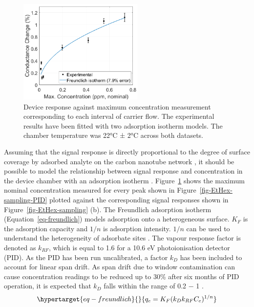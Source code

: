 \documentclass[
  a4paper,
]{scrbook}
\begin{document}
\begin{figure}

{\centering \includegraphics[width=0.55\textwidth,height=\textheight]{figures/ch6/EtHex-ratio-comparison.png}

}

\caption{\label{fig-EtHex-ratio-comparison}Device response against
maximum concentration measurement corresponding to each interval of
carrier flow. The experimental results have been fitted with two
adsorption isotherm models. The chamber temperature was 22°C ± 2°C
across both datasets.}

\end{figure}

Assuming that the signal response is directly proportional to the degree
of surface coverage by adsorbed analyte on the carbon nanotube network
\autocite{Lee2005}, it should be possible to model the relationship
between signal response and concentration in the device chamber with an
adsorption isotherm \autocite{Agnihotri2005}.
Figure~\ref{fig-EtHex-ratio-comparison} shows the maximum nominal
concentration measured for every peak shown in
Figure~\ref{fig-EtHex-sampling-PID} plotted against the corresponding
signal responses shown in Figure~\ref{fig-EtHex-sampling} (b). The
Freundlich adsorption isotherm (Equation~\ref{eq-freundlich}) models
adsorption onto a heterogeneous surface. \(K_F\) is the adsorption
capacity and \(1/n\) is adsorption intensity. \(1/n\) can be used to
understand the heterogeneity of adsorbate sites
\autocite{Ayawei2017,Sabzehmeidani2021}. The vapour response factor is
denoted as \(k_{RF}\), which is equal to 1.6 for a 10.6 eV
photoionisation detector (PID). As the PID has been run uncalibrated, a
factor \(k_{D}\) has been included to account for linear span drift. As
span drift due to window contamination can cause concentration readings
to be reduced up to 30\% after six months of PID operation, it is
expected that \(k_{D}\) falls within the range of 0.2 \(-\) 1
\autocite{PIDmanual,Ionscience}.
\begin{equation}\protect\hypertarget{eq-freundlich}{}{
q_e = K_F(k_Dk_{RF}C_e)^{1/n}
}\label{eq-freundlich}\end{equation}
\end{document}
